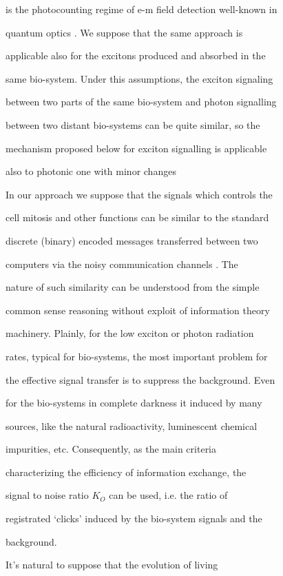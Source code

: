 is the photocounting regime of  e-m field detection well-known in

quantum optics \cite {mayb:8}. We suppose that the same approach is

applicable also for the excitons produced and absorbed in the

same bio-system. Under this assumptions, the exciton signaling

between two parts  of the same bio-system and photon signalling

between two distant bio-systems can be quite similar, so the

mechanism proposed below for exciton signalling is applicable

also to photonic one with minor changes







In our approach we suppose  that the  signals which controls the

cell mitosis and other  functions  can be similar to the standard

discrete (binary) encoded messages transferred between two

computers  via the noisy communication channels \cite {mayb:C4}. The

nature of such similarity can be understood from the simple

common sense reasoning without exploit of information theory

machinery. Plainly, for the  low exciton or photon radiation

rates, typical for bio-systems, the most important problem for

the effective signal transfer is to suppress the background. Even

for the bio-systems in complete darkness it induced by many

sources, like  the natural radioactivity, luminescent chemical

impurities, etc. Consequently, as the main criteria

characterizing  the efficiency of information exchange, the

signal to noise ratio $K_O$ can be used, i.e. the ratio of

registrated `clicks' induced by the bio-system signals and  the

background.

 It's natural to suppose that the evolution of living

